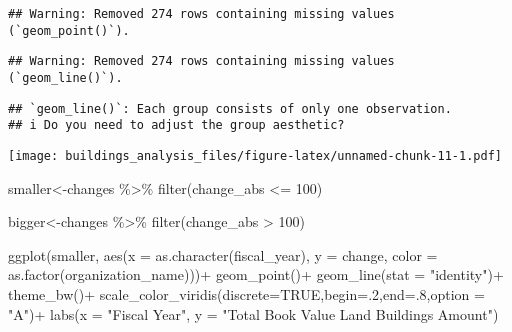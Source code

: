 \documentclass[
]{article}
\newenvironment{Shaded}{\begin{snugshade}}{\end{snugshade}}
\newcommand{\AttributeTok}[1]{\textcolor[rgb]{0.77,0.63,0.00}{#1}}
\newcommand{\ConstantTok}[1]{\textcolor[rgb]{0.00,0.00,0.00}{#1}}
\newcommand{\DecValTok}[1]{\textcolor[rgb]{0.00,0.00,0.81}{#1}}
\newcommand{\FunctionTok}[1]{\textcolor[rgb]{0.00,0.00,0.00}{#1}}
\newcommand{\NormalTok}[1]{#1}
\newcommand{\OtherTok}[1]{\textcolor[rgb]{0.56,0.35,0.01}{#1}}
\newcommand{\SpecialCharTok}[1]{\textcolor[rgb]{0.00,0.00,0.00}{#1}}
\newcommand{\StringTok}[1]{\textcolor[rgb]{0.31,0.60,0.02}{#1}}
\begin{document}
\begin{verbatim}
## Warning: Removed 274 rows containing missing values (`geom_point()`).
\end{verbatim}

\begin{verbatim}
## Warning: Removed 274 rows containing missing values (`geom_line()`).
\end{verbatim}

\begin{verbatim}
## `geom_line()`: Each group consists of only one observation.
## i Do you need to adjust the group aesthetic?
\end{verbatim}

\texttt{[image: buildings\_analysis\_files/figure-latex/unnamed-chunk-11-1.pdf]}

\begin{Shaded}
\begin{Highlighting}[]
\NormalTok{smaller}\OtherTok{\textless{}{-}}\NormalTok{changes }\SpecialCharTok{\%\textgreater{}\%} 
  \FunctionTok{filter}\NormalTok{(change\_abs }\SpecialCharTok{\textless{}=} \DecValTok{100}\NormalTok{)}

\NormalTok{bigger}\OtherTok{\textless{}{-}}\NormalTok{changes }\SpecialCharTok{\%\textgreater{}\%} 
  \FunctionTok{filter}\NormalTok{(change\_abs }\SpecialCharTok{\textgreater{}} \DecValTok{100}\NormalTok{)}
\end{Highlighting}
\end{Shaded}

\begin{Shaded}
\begin{Highlighting}[]
  \FunctionTok{ggplot}\NormalTok{(smaller, }\FunctionTok{aes}\NormalTok{(}\AttributeTok{x =} \FunctionTok{as.character}\NormalTok{(fiscal\_year), }\AttributeTok{y =}\NormalTok{ change, }\AttributeTok{color =} \FunctionTok{as.factor}\NormalTok{(organization\_name)))}\SpecialCharTok{+}
    \FunctionTok{geom\_point}\NormalTok{()}\SpecialCharTok{+}
    \FunctionTok{geom\_line}\NormalTok{(}\AttributeTok{stat =} \StringTok{"identity"}\NormalTok{)}\SpecialCharTok{+}
    \FunctionTok{theme\_bw}\NormalTok{()}\SpecialCharTok{+}
    \FunctionTok{scale\_color\_viridis}\NormalTok{(}\AttributeTok{discrete=}\ConstantTok{TRUE}\NormalTok{,}\AttributeTok{begin=}\NormalTok{.}\DecValTok{2}\NormalTok{,}\AttributeTok{end=}\NormalTok{.}\DecValTok{8}\NormalTok{,}\AttributeTok{option =} \StringTok{"A"}\NormalTok{)}\SpecialCharTok{+}
    \FunctionTok{labs}\NormalTok{(}\AttributeTok{x =} \StringTok{"Fiscal Year"}\NormalTok{, }\AttributeTok{y =} \StringTok{"Total Book Value Land Buildings Amount"}\NormalTok{)}
\end{Highlighting}
\end{Shaded}
\end{document}

